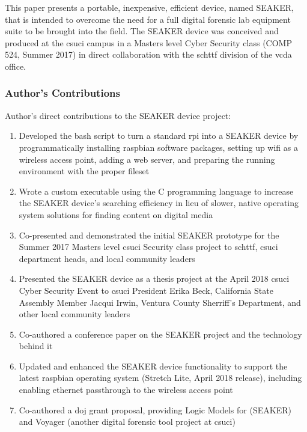 \documentclass[12pt]{article}
\begin{document}
This paper presents a portable, inexpensive, efficient device, named SEAKER,
that is intended to overcome the need for a full digital
forensic lab equipment suite to be brought into the field.  The SEAKER device was conceived and 
produced at the \gls{csuci} campus in a 
Masters level Cyber Security class (COMP 524, Summer 2017) in direct collaboration with the
\gls{schttf} division of the \gls{vcda} office.\\


\subsubsection{Author's Contributions}
Author's direct contributions to the SEAKER device project:
\begin{enumerate}
  \item Developed the bash script to turn a standard \gls{rpi} into a
  SEAKER device by programmatically
  installing raspbian software packages, setting up \gls{wifi} as a wireless access point, adding a web server,
  and preparing the running environment with the proper fileset
  \item Wrote a custom executable using the C programming language to increase the SEAKER device's 
  searching efficiency in lieu of slower, native operating
  system solutions for finding content on digital media
  \item Co-presented and demonstrated the initial SEAKER prototype for the Summer 2017 Masters level \gls{csuci}
  Security class project to \gls{schttf}, \gls{csuci} department heads, and local community leaders
  \item Presented the SEAKER device as a thesis project at the April 2018 \gls{csuci} Cyber Security Event
  to \gls{csuci} President
  Erika Beck, California State Assembly Member Jacqui Irwin, Ventura County Sherriff's Department,
  and other local community leaders
  \item Co-authored a conference paper on the SEAKER project and the technology behind it
  \item Updated and enhanced the SEAKER device functionality to support the latest raspbian operating system (Stretch
  Lite, April 2018 release), including enabling ethernet passthrough to the wireless access point
  \item Co-authored a \gls{doj} grant proposal, providing Logic Models
  for (SEAKER) and Voyager (another digital forensic tool project at \gls{csuci})
\end{enumerate}
\end{document}
